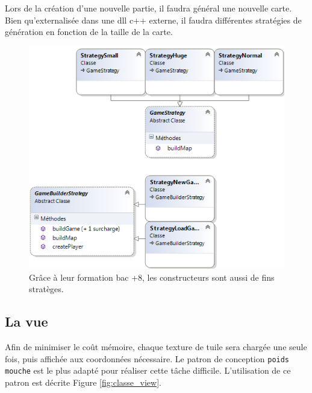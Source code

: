 		Lors de la création d'une nouvelle partie, il faudra général une nouvelle carte. Bien qu'externalisée dans une dll c++ externe, il faudra différentes stratégies de génération en fonction de la taille de la carte.


		\begin{figure}[h!]
			\begin{center}
				\includegraphics[width=1\textwidth]{figure/classe_builder.png}
			\end{center}
			\caption{Grâce à leur formation bac +8, les constructeurs sont aussi de fins stratèges.}
			\label{fig:classe_builder}
		\end{figure}


	\subsection{La vue}
		Afin de minimiser le coût mémoire, chaque texture de tuile sera chargée une seule fois, puis affichée aux coordonnées nécessaire.
		Le patron de conception \verb|poids mouche| est le plus adapté pour réaliser cette tâche difficile.
		L'utilisation de ce patron est décrite Figure \ref{fig:classe_view}.

